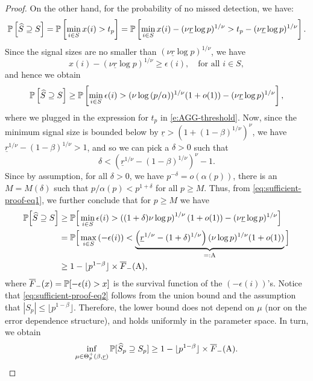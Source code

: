 \begin{proof}
On the other hand, for the probability of no missed detection, we have:
\begin{equation*}
    \P\left[\widehat{S} \supseteq S\right] 
        = \P\left[\min_{i\in S}x(i) > t_p\right]
        = \P\left[\min_{i\in S}x(i) - (\nu\underline{r}\log p)^{1/\nu} > t_p - (\nu\underline{r}\log p)^{1/\nu} \right].
\end{equation*}
Since the signal sizes are no smaller than $(\nu\underline{r}\log p)^{1/\nu}$, we have
\begin{equation*}
    x(i) - \left(\nu\underline{r}\log{p}\right)^{1/\nu} \ge \epsilon(i), \quad \text{for all }i\in S,
\end{equation*}
and hence we obtain
\begin{equation} \label{eq:sufficient-proof-eq1}
    \P\left[\widehat{S} \supseteq S\right] \ge 
    \P\left[\min_{i\in S}\epsilon(i) > (\nu\log{(p/\alpha)})^{1/\nu}(1+o(1)) - (\nu\underline{r}\log p)^{1/\nu} \right],
\end{equation}
where we plugged in the expression for $t_p$ in \eqref{e:AGG-threshold}.
Now, since the minimum signal size is bounded below by $\underline{r} > \left(1 + (1-\beta)^{1/\nu}\right)^\nu$, we have $\underline{r}^{1/\nu}-(1-\beta)^{1/\nu}>1$, and so we can pick a $\delta > 0$ such that 
\begin{equation} \label{eq:choice-of-delta}
    \delta < \left(\underline{r}^{1/\nu} - (1-\beta)^{1/\nu}\right)^\nu - 1.
\end{equation}
Since by assumption, for all $\delta>0$, we have $p^{-\delta} = o\left(\alpha(p)\right)$, there is an
$M=M(\delta)$ such that $p/\alpha(p) < p^{1+\delta}$ for all $p\ge M$. Thus, from \eqref{eq:sufficient-proof-eq1}, we further conclude that for $p\ge M$ we have
\begin{align}
    \P\Big[\widehat{S} \supseteq S\Big]
      &\ge \P\Big[\min_{i\in S}\epsilon(i) > \left((1+\delta)\nu\log{p}\right)^{1/\nu}(1+o(1)) - (\nu\underline{r}\log p)^{1/\nu} \Big] \nonumber \\
      &= \P\Big[\max_{i\in S}\left(-\epsilon(i)\right) < \underbrace{\left(\underline{r}^{1/\nu} - (1+\delta)^{1/\nu}\right)(\nu\log{p})^{1/\nu}(1+o(1))}_{=:\text{A}} \Big] \nonumber \\
      &\ge 1 - \lfloor p^{1-\beta} \rfloor \times \overline{F}_-(\text{A}), \label{eq:sufficient-proof-eq2}
\end{align}
where $\overline{F}_-(x) = \P[-\epsilon(i)>x]$ is the survival function of the $(-\epsilon(i))$'s.
Notice that \eqref{eq:sufficient-proof-eq2} follows from the union bound and the assumption that ${|S_p|}\le{\lfloor p^{1-\beta}\rfloor}$. 
Therefore, the lower bound does not depend on $\mu$ (nor on the error dependence structure), and holds uniformly in the parameter space. In turn, we obtain 
\begin{equation} \label{eq:exact-supporot-recovery-FWNR}
    \inf_{\mu\in\Theta_p^+(\beta, \underline{r})} \P[\widehat{S}_p \supseteq S_p] \ge 1 - \lfloor p^{1-\beta} \rfloor \times \overline{F}_-(\text{A}).
\end{equation}


\end{proof}
